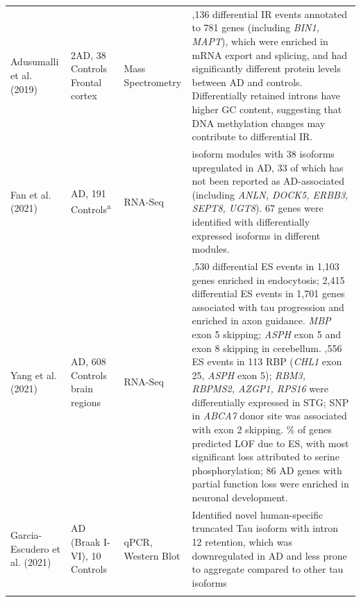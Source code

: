 \begin{landscape}
\begin{longtable}[c]{p{3cm}p{4cm}p{3cm}p{16cm}}
		\centering Adusumalli et al. (2019) \cite{Adusumalli2019} &
		\centering 4 2AD, 38 Controls\cite{Bai2013} \newline Frontal cortex &
		\centering Mass Spectrometry &
		\tabitem 1,136 differential IR events annotated to 781 genes (including \textit{BIN1, MAPT}), which were enriched in mRNA export and splicing, and had significantly different protein levels between AD and controls. \newline
		\tabitem Differentially retained introns have higher GC content, suggesting that DNA methylation changes may contribute to differential IR. \\
		\hdashline[0.5pt/5pt]
		
		\centering Fan et al. (2021) \cite{Fan2021} &
		\centering 210 AD, 191 Controls\textsuperscript{a} &
		\centering RNA-Seq &
		\tabitem 2 isoform modules with 38 isoforms upregulated in AD, 33 of which has not been reported as AD-associated (including \textit{ANLN, DOCK5, ERBB3, SEPT8, UGT8}). 67 genes were identified with differentially expressed isoforms in different modules. \\
		
		\centering Yang et al. (2021) \cite{Yang2021} &
		\centering 1074 AD, 608 Controls \newline 9 brain regions&
		\centering RNA-Seq & 
		\tabitem 1,530 differential ES events in 1,103 genes enriched in endocytosis; 2,415 differential ES events in 1,701 genes associated with tau progression and enriched in axon guidance. \newline 
		\tabitem \textit{MBP} exon 5 skipping; \textit{ASPH} exon 5 and exon 8 skipping in cerebellum. \newline  
		\tabitem 15,556 ES events in 113 RBP (\textit{CHL1} exon 25, \textit{ASPH} exon 5); \textit{RBM3, RBPMS2, AZGP1, RPS16} were differentially expressed in STG; SNP in \textit{ABCA7} donor site was associated with exon 2 skipping. \newline 
		\tabitem 70\% of genes predicted LOF due to ES, with most significant loss attributed to serine phosphorylation; 86 AD genes with partial function loss were enriched in neuronal development.	\\
		\hdashline[0.5pt/5pt]		
		
		\centering Garcia-Escudero et al. (2021) \cite{Garcia-Escudero2021} &
		\centering 32 AD (Braak I-VI), 10 Controls &
		\centering qPCR, Western Blot &
		\tabitem Identified novel human-specific truncated Tau isoform with intron 12 retention, which was downregulated in AD and less prone to aggregate compared to other tau isoforms \\
		\hdashline[0.5pt/5pt]
		

\end{longtable}
\end{landscape}
